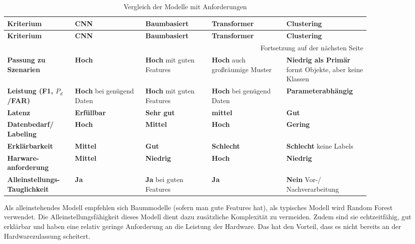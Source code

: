 \small
\begin{longtable}{p{0.16\linewidth}p{0.17\linewidth}p{0.16\linewidth}p{0.18\linewidth}p{0.2\linewidth}}
\caption{Vergleich der Modelle mit Anforderungen}\\
\toprule
\textbf{Kriterium} &
\textbf{CNN} &
\textbf{Baumbasiert} &
\textbf{Transformer} &
\textbf{Clustering} \\
\midrule
\endfirsthead

\toprule
\textbf{Kriterium} &
\textbf{CNN} &
\textbf{Baumbasiert} &
\textbf{Transformer} &
\textbf{Clustering} \\
\midrule
\endhead

\midrule
\multicolumn{5}{r}{Fortsetzung auf der nächsten Seite}\\
\midrule
\endfoot

\bottomrule
\endlastfoot

\textbf{Passung zu Szenarien} &
\textbf{Hoch} &
\textbf{Hoch} mit guten Features &
\textbf{Hoch} auch großräumige Muster &
\textbf{Niedrig als Primär} formt Objekte, aber keine Klassen \\

\textbf{Leistung (F1, $P_d$/FAR)} &
\textbf{Hoch} bei genügend Daten &
\textbf{Hoch} mit guten Features &
\textbf{Hoch} bei genügend Daten &
\textbf{Parameterabhängig} \\

\textbf{Latenz} &
\textbf{Erfüllbar}&
\textbf{Sehr gut} &
\textbf{mittel} &
\textbf{Gut} \\

\textbf{Datenbedarf/ Labeling} &
\textbf{Hoch}  &
\textbf{Mittel} &
\textbf{Hoch} &
\textbf{Gering} \\

\textbf{Erklärbarkeit} &
\textbf{Mittel}  &
\textbf{Gut}  &
\textbf{Schlecht}  &
\textbf{Schlecht} keine Labels \\

\textbf{Harware- anforderung} &
\textbf{Mittel}  &
\textbf{Niedrig} &
\textbf{Hoch}  &
\textbf{Niedrig} \\

\textbf{Alleinstellungs-Tauglichkeit} &
\textbf{Ja}  &
\textbf{Ja} bei guten Features &
\textbf{Ja}  &
\textbf{Nein} Vor-/ Nachverarbeitung \\
\end{longtable}

\medskip
Als alleinstehendes Modell empfehlen sich Baummodelle (sofern man gute Features hat), als typisches Modell wird Random Forest verwendet. 
Die Alleinstellungsfähigkeit dieses Modell dient dazu zusätzliche Komplexität zu vermeiden. 
Zudem sind sie echtzeitfähig, gut erklärbar und haben eine relativ geringe Anforderung an die Leistung der Hardware. 
Das hat den Vorteil, dass es nicht bereits an der Hardwarezulassung scheitert.

